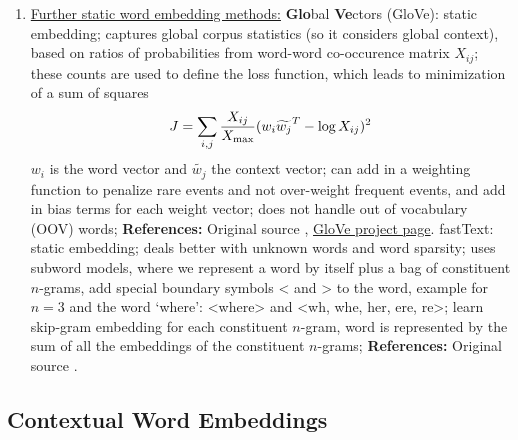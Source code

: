 \documentclass[11pt, a4paper]{amsart}
\begin{document}
\begin{enumerate}
    \item \underline{Further static word embedding methods:}
    \newline
    \textbf{Glo}bal \textbf{Ve}ctors (GloVe):
    \newline
    static embedding;
    captures global corpus statistics (so it considers global context), based on ratios of probabilities from word-word co-occurence matrix $X_{ij}$;
    these counts are used to define the loss function, which leads to minimization of a sum of squares
    \begin{equation*}
        J = \sum_{i, j} \frac{X_{ij}}{X_{\textup{max}}}
        (w_{i} \widetilde{w_{j}}^{T} - \log X_{ij})^{2}
    \end{equation*}
    $w_{i}$ is the word vector and $\widetilde{w_{j}}$ the context vector;
    can add in a weighting function to penalize rare events and not over-weight frequent events, and add in bias terms for each weight vector;
    does not handle out of vocabulary (OOV) words;
    \newline
    \textbf{References:}
    Original source \cite{pennington-etal-2014-glove},
    \href{https://nlp.stanford.edu/projects/glove/}{GloVe project page}.
    \newline
    fastText:
    \newline
    static embedding;
    deals better with unknown words and word sparsity;
    uses subword models, where we represent a word by itself plus a bag of constituent $n$-grams, add special boundary symbols < and > to the word,
    example for $n=3$ and the word `where':
    <where> and <wh, whe, her, ere, re>;
    learn skip-gram embedding for each constituent $n$-gram, word is represented by the sum of all the embeddings of the constituent $n$-grams;
    \newline
    \textbf{References:}
    Original source \cite{DBLP:journals/corr/BojanowskiGJM16}.
\end{enumerate}

\subsection{Contextual Word Embeddings}
\label{sec:contextual_word_embeddings}
\end{document}
